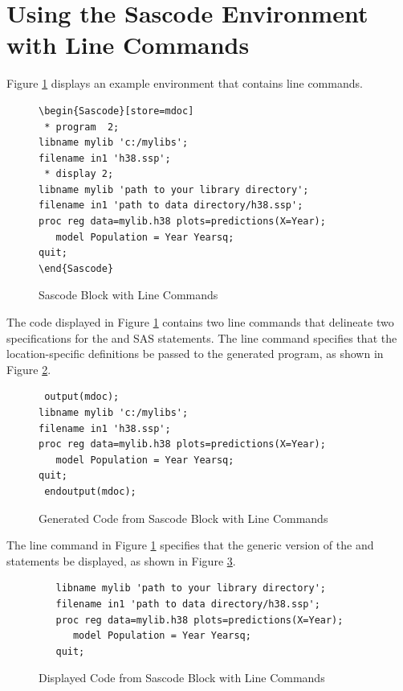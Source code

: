 \documentclass[article,oneside]{memoir}
\begin{document}
\section{Using the Sascode Environment with Line Commands}\label{scexlc}
Figure \ref{sblc} displays an example
   environment that contains line commands.

\begin{figure}[H]
\begin{snugshade}
\begin{verbatim}
\begin{Sascode}[store=mdoc]
 * program  2;
libname mylib 'c:/mylibs';
filename in1 'h38.ssp';
 * display 2;
libname mylib 'path to your library directory';
filename in1 'path to data directory/h38.ssp';
proc reg data=mylib.h38 plots=predictions(X=Year);
   model Population = Year Yearsq;
quit;
\end{Sascode}
\end{verbatim}
\end{snugshade}
\caption{Sascode Block with Line Commands}\label{sblc}
\end{figure}
  The code displayed in Figure \ref{sblc} contains
  two line commands that delineate two
  specifications for the  and  SAS statements.
  The line command  specifies that the location-specific
  definitions be passed to the generated program,
   as shown in Figure \ref{fig:gsblc}.
\begin{figure}[H]
\begin{snugshade}
\begin{verbatim}
 output(mdoc);
libname mylib 'c:/mylibs';
filename in1 'h38.ssp';
proc reg data=mylib.h38 plots=predictions(X=Year);
   model Population = Year Yearsq;
quit;
 endoutput(mdoc);
\end{verbatim}
\end{snugshade}
\caption{Generated Code from Sascode Block with Line Commands}\label{fig:gsblc}
\end{figure}

  The line command  in Figure \ref{sblc}
  specifies that the generic version
  of the  and  statements be displayed,
  as shown in Figure \ref{dsblc}.
\begin{figure}[H]
\begin{snugshade}
\begin{verbatim}
   libname mylib 'path to your library directory';
   filename in1 'path to data directory/h38.ssp';
   proc reg data=mylib.h38 plots=predictions(X=Year);
      model Population = Year Yearsq;
   quit;
\end{verbatim}
\end{snugshade}
\caption{Displayed Code from Sascode Block with Line Commands}\label{dsblc}
\end{figure}
\end{document}
